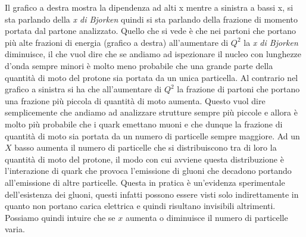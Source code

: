 Il grafico a destra mostra la dipendenza ad alti x mentre a sinistra a bassi x, si sta parlando della \emph{x di Bjorken} quindi si sta parlando della frazione di momento portata dal partone analizzato.
Quello che si vede è che nei partoni che portano più alte frazioni di energia (grafico a destra) all'aumentare di $Q^2$ la \emph{x di Bjorken} diminuisce, il che vuol dire che se andiamo ad ispezionare il nucleo con lunghezze d'onda sempre minori è molto meno probabile che una grande parte della quantità di moto del protone sia portata da un unica particella.
Al contrario nel grafico a sinistra si ha che all'aumentare di $Q^2$ la frazione di partoni che portano una frazione più piccola di quantità di moto aumenta.
Questo vuol dire semplicemente che andiamo ad analizzare strutture sempre più piccole e allora è molto più probabile che i quark emettano muoni e che dunque la frazione di quantità di moto sia portata da un numero di particelle sempre maggiore.
Ad un $X$ basso aumenta il numero di particelle che si distribuiscono tra di loro la quantità di moto del protone, il modo con cui avviene questa distribuzione è l'interazione di quark che provoca l'emissione di gluoni che decadono portando all'emissione di altre particelle.
Questa in pratica è un'evidenza sperimentale dell'esistenza dei gluoni, questi infatti possono essere visti solo indirettamente in quanto non portano carica elettrica e quindi risultano invisibili altrimenti.
Possiamo quindi intuire che se $x$ aumenta o diminuisce il numero di particelle varia.

